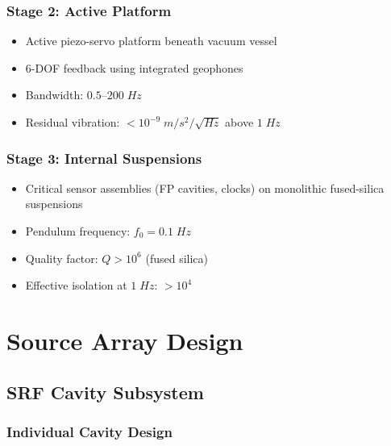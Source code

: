 \documentclass[11pt,a4paper]{article}
\begin{document}
\subsubsection{Stage 2: Active Platform}

\begin{itemize}[nosep]
\item Active piezo-servo platform beneath vacuum vessel
\item 6-DOF feedback using integrated geophones
\item Bandwidth: $0.5$--$200\;\si{Hz}$
\item Residual vibration: $< 10^{-9}\;\si{m/s^2/\sqrt{Hz}}$
above $1\;\si{Hz}$
\end{itemize}

\subsubsection{Stage 3: Internal Suspensions}

\begin{itemize}[nosep]
\item Critical sensor assemblies (FP cavities, clocks) on
monolithic fused-silica suspensions
\item Pendulum frequency: $f_0 = 0.1\;\si{Hz}$
\item Quality factor: $Q > 10^6$ (fused silica)
\item Effective isolation at $1\;\si{Hz}$: $> 10^4$
\end{itemize}

\section{Source Array Design}

\subsection{SRF Cavity Subsystem}

\subsubsection{Individual Cavity Design}
\end{document}
